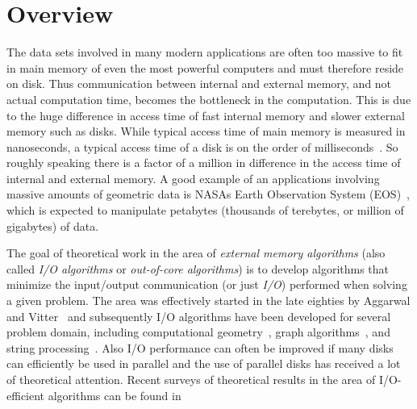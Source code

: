\chapter{Overview}

The data sets involved in many modern applications are often too massive to
fit in main memory of even the most powerful computers and must therefore
reside on disk. Thus communication between internal and external memory,
and not actual computation time, becomes the bottleneck in the
computation. This is due to the huge difference in access time of fast
internal memory and slower external memory such as disks. While typical
access time of main memory is measured in nanoseconds, a typical access
time of a disk is on the order of milliseconds~\cite{cockcroft:sun}. So
roughly speaking there is a factor of a million in difference in the access
time of internal and external memory. A good example of an applications
involving massive amounts of geometric data is NASAs Earth Observation
System (EOS)~\cite{cromp,kobler:nasa}, which is expected to manipulate
petabytes (thousands of terebytes, or million of gigabytes) of data.

The goal of theoretical work in the area of {\em external memory
algorithms\/} (also called {\em I/O algorithms\/} or {\em out-of-core
algorithms}) is to develop algorithms that minimize the input/output
communication (or just {\em I/O}) performed when solving a given
problem. The area was effectively started in the late eighties by Aggarwal
and Vitter~\cite{aggarwal:input} and subsequently I/O algorithms have been
developed for several problem domain, including computational
geometry~\cite{goodrich:external,arge:buffer,arge:theory,arge:gis,aamvv-empgbtag97,arge:interval,kanellakis:indexing,ramaswamy:path,subramanian:p-range,vengroff:efficient,agarwal:efficient,zhu:further,agarwal:point,arge:scalable,arge:theory,callahan:topology,franciosa:orders,grossi:cross-tree,zhu:further},
 graph
algorithms~\cite{chiang:external,arge:buffer,kumar:improved,abello:functional,crauser:randomized,arge:obdd,feuerstein:memory,nodine:blocking,ullman:input},
 and string
processing~\cite{ferragina:fully,ferragina:fast,arge:strings,crauser:construction}.
Also I/O performance can often be improved if many disks can efficiently be
used in parallel and the use of parallel disks
 has received a lot of
theoretical attention. Recent surveys of theoretical
results in the area of I/O-efficient algorithms can be found
in~\cite{arge:gisbook,arge:thesis,vitter:podssurvey,vitter:extdatassurvey}

